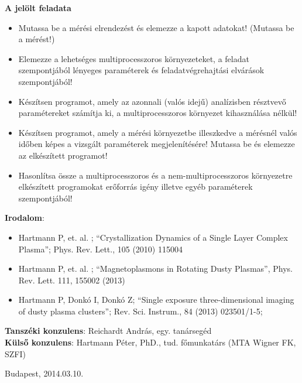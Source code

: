 \begin{flushleft}
\textbf{A jelölt feladata}

\begin{itemize}
	\item Mutassa be a mérési elrendezést és elemezze a kapott adatokat! (Mutassa
	be a mérést!)
	\item Elemezze a lehetséges multiprocesszoros környezeteket, a feladat
	szempontjából lényeges paraméterek és feladatvégrehajtási elvárások szempontjából!
	\item Készítsen programot, amely az azonnali (valós idejű) analízisben résztvevő paramétereket számítja ki, a
	multiprocesszoros környezet kihasználása nélkül!
	\item Készítsen programot, amely a mérési környezetbe illeszkedve a mérésnél
	valós időben képes a vizsgált paraméterek megjelenítésére! Mutassa be és
	elemezze az elkészített programot!
	\item Hasonlítsa össze a multiprocesszoros és a nem-multiprocesszoros
	környezetre elkészített programokat erőforrás igény illetve egyéb paraméterek szempontjából!
\end{itemize}
\end{flushleft}

\begin{flushleft}
\textbf{Irodalom}:
\begin{itemize}
	\item \cite{Hartmann2010} Hartmann P, et. al. ; “Crystallization Dynamics of a Single Layer Complex Plasma”;
	Phys. Rev. Lett., 105 (2010) 115004
	\item \cite{Hartmann2013} Hartmann P, et. al. ; “Magnetoplasmons in Rotating Dusty	Plasmas”, Phys.	Rev. Lett.
	111, 155002 (2013)
	\item \cite{HartmannP2013} Hartmann P, Donkó I, Donkó Z; “Single exposure three-dimensional imaging of dusty
	plasma clusters”; Rev. Sci. Instrum., 84 (2013) 023501/1-5;
\end{itemize}
\end{flushleft}

\begin{flushleft}
\vspace*{1cm}
\textbf{Tanszéki konzulens}: Reichardt András, egy. tanársegéd\\
\textbf{Külső konzulens}: Hartmann Péter, PhD., tud. főmunkatárs (MTA Wigner FK,
SZFI)
\end{flushleft}



\begin{flushleft}
\vspace*{1cm}
Budapest, 2014.03.10.
\end{flushleft}
